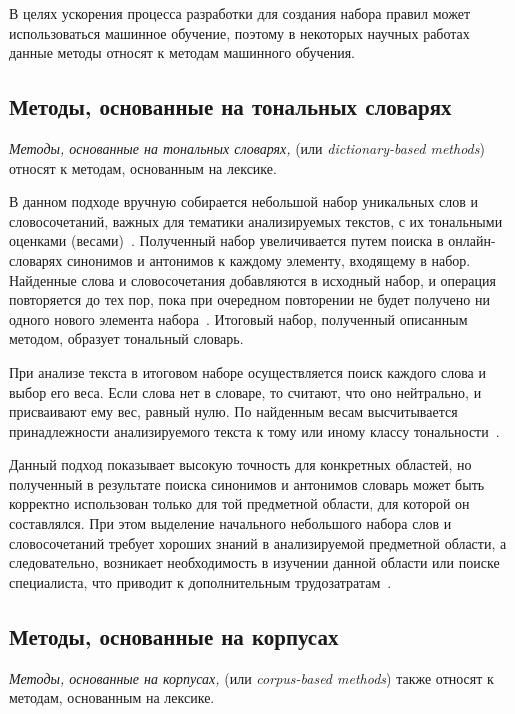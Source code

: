 В целях ускорения процесса разработки для создания набора правил может
использоваться машинное обучение, поэтому в некоторых научных
работах~\cite{article11,article13} данные методы относят к методам
машинного обучения.

\subsection{Методы, основанные на тональных словарях}

\textit{Методы, основанные на тональных словарях,} (или \textit{dictionary-based
methods}) относят к методам, основанным на лексике.

В данном подходе вручную собирается небольшой набор уникальных слов и
словосочетаний, важных для тематики анализируемых текстов, с их тональными
оценками (весами)~\cite{article05}. Полученный набор увеличивается путем поиска в
онлайн-словарях синонимов и антонимов к каждому элементу, входящему в набор.
Найденные слова и словосочетания добавляются в исходный набор, и операция
повторяется до тех пор, пока при очередном повторении не будет получено ни
одного нового элемента набора~\cite{article14}. Итоговый набор, полученный
описанным методом, образует тональный словарь.

При анализе текста в итоговом наборе осуществляется поиск каждого слова и выбор
его веса. Если слова нет в словаре, то считают, что оно нейтрально, и
присваивают ему вес, равный нулю. По найденным весам высчитывается
принадлежности анализируемого текста к тому или иному классу
тональности~\cite{article05}.

Данный подход показывает высокую точность для конкретных областей, но полученный
в результате поиска синонимов и антонимов словарь может быть корректно
использован только для той предметной области, для которой он составлялся. При
этом выделение начального небольшого набора слов и словосочетаний требует
хороших знаний в анализируемой предметной области, а следовательно, возникает
необходимость в изучении данной области или поиске специалиста, что приводит к
дополнительным трудозатратам~\cite{article05}.


\subsection{Методы, основанные на корпусах}

\textit{Методы, основанные на корпусах,} (или \textit{corpus-based
methods}) также относят к методам, основанным на лексике.

